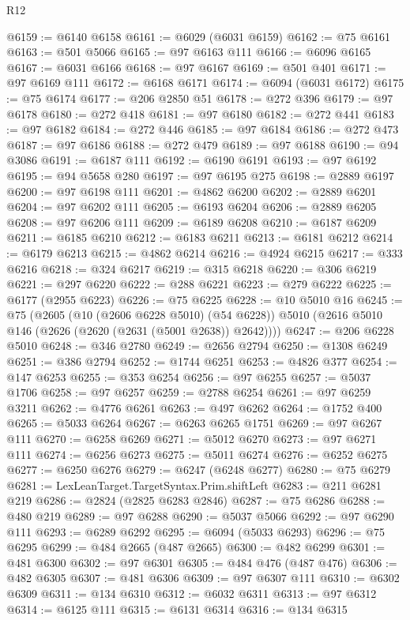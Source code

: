 \begin{lexlean}{R12}
\begin{coremodule}
{{{{{{{{{{{{{{{{{{{{{{{{{{{{{{{{{{{{{{{{{{{{{{{{{{{{{{{{{{{{{{{{{{{{{{{{{{{{{{{{{{@6159 := @6140 @6158
@6161 := @6029 (@6031 @6159)
@6162 := @75 @6161
@6163 := @501 @5066
@6165 := @97 @6163 @111
@6166 := @6096 @6165
@6167 := @6031 @6166
@6168 := @97 @6167
@6169 := @501 @401
@6171 := @97 @6169 @111
@6172 := @6168 @6171
@6174 := @6094 (@6031 @6172)
@6175 := @75 @6174
@6177 := @206 @2850 @51
@6178 := @272 @396
@6179 := @97 @6178
@6180 := @272 @418
@6181 := @97 @6180
@6182 := @272 @441
@6183 := @97 @6182
@6184 := @272 @446
@6185 := @97 @6184
@6186 := @272 @473
@6187 := @97 @6186
@6188 := @272 @479
@6189 := @97 @6188
@6190 := @94 @3086
@6191 := @6187 @111
@6192 := @6190 @6191
@6193 := @97 @6192
@6195 := @94 @5658 @280
@6197 := @97 @6195 @275
@6198 := @2889 @6197
@6200 := @97 @6198 @111
@6201 := @4862 @6200
@6202 := @2889 @6201
@6204 := @97 @6202 @111
@6205 := @6193 @6204
@6206 := @2889 @6205
@6208 := @97 @6206 @111
@6209 := @6189 @6208
@6210 := @6187 @6209
@6211 := @6185 @6210
@6212 := @6183 @6211
@6213 := @6181 @6212
@6214 := @6179 @6213
@6215 := @4862 @6214
@6216 := @4924 @6215
@6217 := @333 @6216
@6218 := @324 @6217
@6219 := @315 @6218
@6220 := @306 @6219
@6221 := @297 @6220
@6222 := @288 @6221
@6223 := @279 @6222
@6225 := @6177 (@2955 @6223)
@6226 := @75 @6225
@6228 := @10 @5010 @16
@6245 := @75
    (@2605
      (@10 (@2606 @6228 @5010) (@54 @6228))
      @5010
      (@2616 @5010 @146 (@2626 (@2620 (@2631 (@5001 @2638)) @2642))))
@6247 := @206 @6228 @5010
@6248 := @346 @2780
@6249 := @2656 @2794
@6250 := @1308 @6249
@6251 := @386 @2794
@6252 := @1744 @6251
@6253 := @4826 @377
@6254 := @147 @6253
@6255 := @353 @6254
@6256 := @97 @6255
@6257 := @5037 @1706
@6258 := @97 @6257
@6259 := @2788 @6254
@6261 := @97 @6259 @3211
@6262 := @4776 @6261
@6263 := @497 @6262
@6264 := @1752 @400
@6265 := @5033 @6264
@6267 := @6263 @6265 @1751
@6269 := @97 @6267 @111
@6270 := @6258 @6269
@6271 := @5012 @6270
@6273 := @97 @6271 @111
@6274 := @6256 @6273
@6275 := @5011 @6274
@6276 := @6252 @6275
@6277 := @6250 @6276
@6279 := @6247 (@6248 @6277)
@6280 := @75 @6279
@6281 := LexLeanTarget.TargetSyntax.Prim.shiftLeft
@6283 := @211 @6281 @219
@6286 := @2824 (@2825 @6283 @2846)
@6287 := @75 @6286
@6288 := @480 @219
@6289 := @97 @6288
@6290 := @5037 @5066
@6292 := @97 @6290 @111
@6293 := @6289 @6292
@6295 := @6094 (@5033 @6293)
@6296 := @75 @6295
@6299 := @484 @2665 (@487 @2665)
@6300 := @482 @6299
@6301 := @481 @6300
@6302 := @97 @6301
@6305 := @484 @476 (@487 @476)
@6306 := @482 @6305
@6307 := @481 @6306
@6309 := @97 @6307 @111
@6310 := @6302 @6309
@6311 := @134 @6310
@6312 := @6032 @6311
@6313 := @97 @6312
@6314 := @6125 @111
@6315 := @6131 @6314
@6316 := @134 @6315
}}}}}}}}}}}}}}}}}}}}}}}}}}}}}}}}}}}}}}}}}}}}}}}}}}}}}}}}}}}}}}}}}}}}}}}}}}}}}}}}}}
\end{coremodule}
\end{lexlean}
